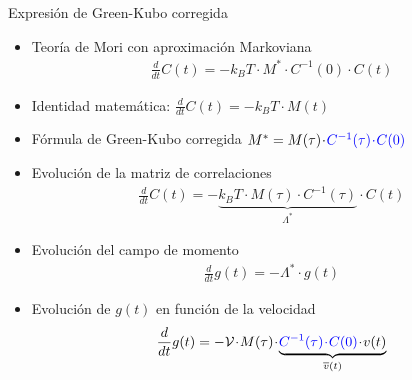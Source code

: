 \documentclass{beamer}
\newcommand{\esc}{\!\cdot\!}
\begin{document}
\begin{frame}{Expresión de Green-Kubo corregida}
  \begin{itemize}
    \item<1-> Teoría de Mori con aproximación Markoviana
      \begin{align}
        \frac{d}{dt}C(t)=-k_BT\esc M^*\esc C^{-1}(0)\esc C(t)
        \nonumber
      \end{align}
    \item<2-> Identidad matemática:  $\frac{d}{dt}C(t)=-k_B T\esc M(t)$
    \item<3-> Fórmula de Green-Kubo corregida  
      $ M^*=M(\tau)\esc {\color{blue}C^{-1}(\tau)\esc C(0)}$
    \item<4-> Evolución de la matriz de correlaciones
      \begin{align}
        \frac{d}{dt}C(t)=-\underbrace{k_BT\esc M(\tau)\esc  C^{-1}(\tau)}_{\Lambda^*}\esc C(t)
        \nonumber
      \end{align}
    \item<5-> Evolución del campo de momento
      \begin{align}
        \frac{d}{dt}g(t)=-\Lambda^*\esc g(t)
        \nonumber
      \end{align}
    \item<6-> Evolución de $g(t)$ en función de la velocidad
      \begin{align}
        \frac{d}{dt}g(t)=-{\cal V}\esc M(\tau)\esc \underbrace{{\color{blue}C^{-1}(\tau)\esc C(0)}\esc v(t)}_{\overline{v}(t)}
        \nonumber
      \end{align}
  \end{itemize}
\end{frame}
\end{document}
